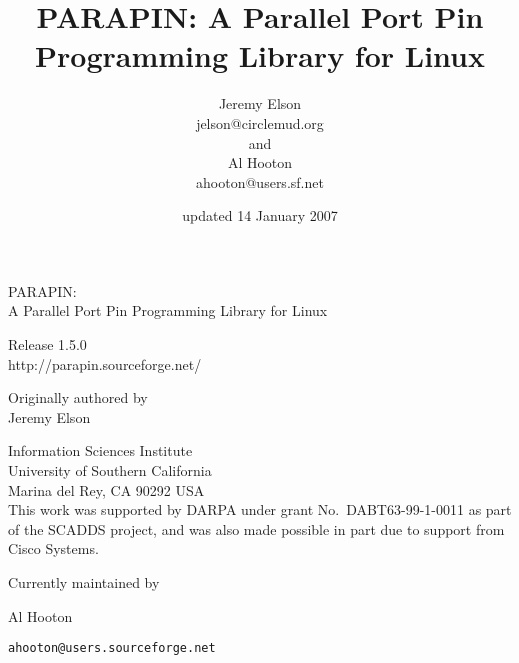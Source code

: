 \documentclass{article}
\title{PARAPIN:
A Parallel Port Pin Programming Library for Linux}
\author{Jeremy Elson\\
jelson@circlemud.org\\
and\\
Al Hooton\\
ahooton@users.sf.net}
\date{updated 14 January 2007}
\begin{document}

\begin{center}
\begin{latexonly}\vspace*{1in}\end{latexonly}
{\Huge PARAPIN:} \\
\vspace{2\baselineskip}
{\huge A Parallel Port Pin Programming Library for Linux}

{\Large Release 1.5.0 \\
\vspace{2\baselineskip}
http://parapin.sourceforge.net/}

\begin{latexonly}\vspace{0.5in}\end{latexonly}
\vspace{\baselineskip}

{\Large Originally authored by \\
Jeremy Elson \\
\begin{latexonly}\vspace{.5\baselineskip}\end{latexonly}

\vfill

Information Sciences Institute \\
University of Southern California \\
Marina del Rey, CA 90292   USA \\
\vspace{\baselineskip}
This work was supported by DARPA under grant No.\ DABT63-99-1-0011 as
part of the SCADDS project, and was also made possible in part due to
support from Cisco Systems.

\vfill

\begin{latexonly}\vspace{1in}\end{latexonly}
Currently maintained by \\
{\Large Al Hooton \\
\begin{latexonly}\vspace{.5\baselineskip}\end{latexonly}
{\tt ahooton@users.sourceforge.net}}}
\end{center}
\thispagestyle{empty}
\clearpage
\end{document}
